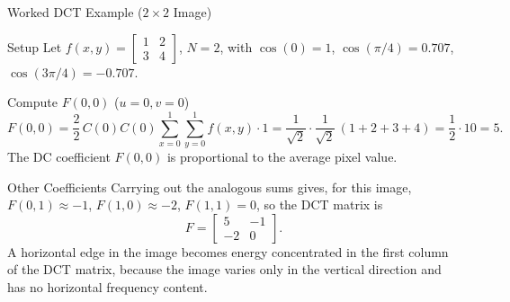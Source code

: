 \documentclass{beamer}
\begin{document}
\begin{frame}[shrink=10]{Worked DCT Example ($2\times2$ Image)}
  \begin{block}{Setup}
    Let $f(x,y) = \begin{bmatrix} 1 & 2\\ 3 & 4 \end{bmatrix}$, $N=2$,
    with $\cos(0)=1$, $\cos(\pi/4)=0.707$, $\cos(3\pi/4)=-0.707$.
  \end{block}

  \begin{block}{Compute $F(0,0)$ ($u=0,v=0$)}
    \[
      F(0,0) = \frac{2}{2}\,C(0)C(0)\sum_{x=0}^{1}\sum_{y=0}^{1} f(x,y)\cdot 1
        = \frac{1}{\sqrt2}\cdot\frac{1}{\sqrt2}\,(1+2+3+4)
        = \frac{1}{2}\cdot 10 = 5 .
    \]
    The DC coefficient $F(0,0)$ is proportional to the average pixel value.
  \end{block}

  \begin{block}{Other Coefficients}
    Carrying out the analogous sums gives, for this image,
    $F(0,1) \approx -1$, $F(1,0) \approx -2$, $F(1,1) = 0$, so the DCT
    matrix is
    \[
      F = \begin{bmatrix} 5 & -1\\ -2 & 0 \end{bmatrix}.
    \]
    A horizontal edge in the image becomes energy concentrated in the first
    column of the DCT matrix, because the image varies only in the vertical
    direction and has no horizontal frequency content.
  \end{block}
\end{frame}
\end{document}
